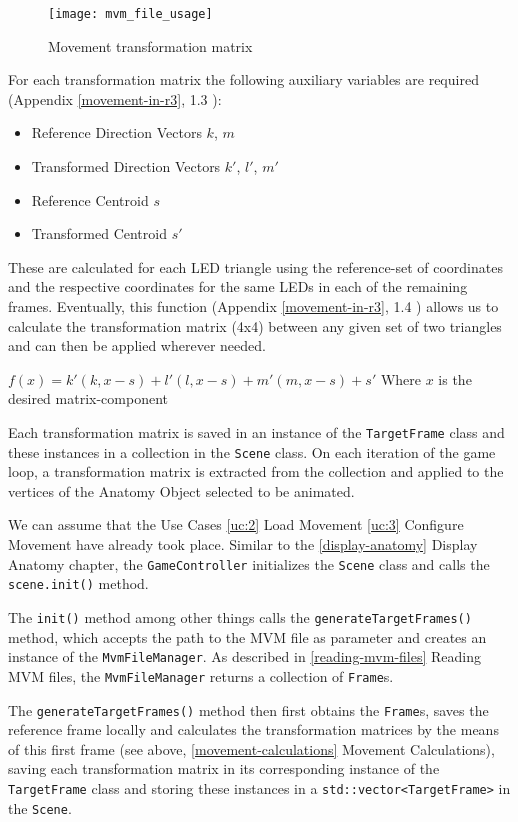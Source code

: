 \begin{figure}[h!]
	\centering
	\texttt{[image: mvm\_file\_usage]}
	\caption{Movement transformation matrix}
\end{figure}

\noindent For each transformation matrix the following auxiliary variables are required (Appendix \ref{movement-in-r3}, 1.3 ):

\begin{itemize}
	\item[] Reference Direction Vectors $k$, $m$
	\item[] Transformed Direction Vectors $k'$, $l'$, $m'$
	\item[] Reference Centroid $s$
	\item[] Transformed Centroid $s'$
\end{itemize}

\noindent These are calculated for each LED triangle using the reference-set of coordinates and the respective coordinates for the same LEDs in each of the remaining frames. Eventually, this function (Appendix \ref{movement-in-r3}, 1.4 ) allows us to calculate the transformation matrix (4x4) between any given set of two triangles and can then be applied wherever needed.

\centerline{$\boxed{f(x) = k'(k,x-s)+l'(l,x-s)+m'(m,x-s)+s'}$ Where $x$ is the desired matrix-component}

Each transformation matrix is saved in an instance of the \verb|TargetFrame| class and these instances in a collection in the \verb|Scene| class. On each iteration of the game loop, a transformation matrix is extracted from the collection and applied to the vertices of the Anatomy Object selected to be animated.



We can assume that the Use Cases \ref{uc:2} Load Movement \ref{uc:3} Configure Movement have already took place. Similar to the  \ref{display-anatomy} Display Anatomy chapter, the \verb|GameController| initializes the \verb|Scene| class and calls the \verb|scene.init()| method.

The \verb|init()| method among other things calls the \verb|generateTargetFrames()| method, which accepts the path to the MVM file as parameter and creates an instance of the \verb|MvmFileManager|. As described in \ref{reading-mvm-files} Reading MVM files, the \verb|MvmFileManager| returns a collection of \verb|Frame|s.

The \verb|generateTargetFrames()| method then first obtains the \verb|Frame|s, saves the reference frame locally and calculates the transformation matrices by the means of this first frame (see above, \ref{movement-calculations} Movement Calculations), saving each transformation matrix in its corresponding instance of the \verb|TargetFrame| class and storing these instances in a \verb|std::vector<TargetFrame>| in the \verb|Scene|.

